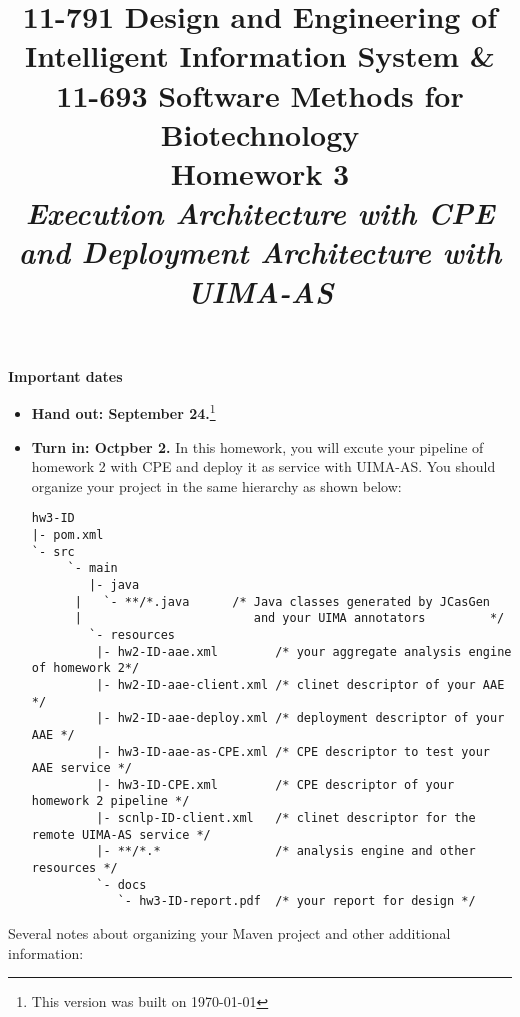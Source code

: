 \documentclass[oneside]{memoir}
\title{{\bfseries 11-791 Design and Engineering of Intelligent Information
System \& \\11-693 Software Methods for Biotechnology \\Homework 3}\\
\vspace{1em}
\itshape\rmfamily 
Execution Architecture with CPE and Deployment Architecture with UIMA-AS}
\date{}
\begin{document}
\begin{titlingpage}
\maketitle

\hspace{-0.1\textwidth}
\begin{minipage}{1.2\textwidth}
\vspace{-5em}
\textbf{Important dates}
\begin{itemize}

\item \textbf{Hand out: September 24.}\footnote{This version was built on \today}

\item \textbf{Turn in: Octpber 2.} In this homework, you will excute your pipeline of homework 2
with CPE and deploy it as service with UIMA-AS. 
You should organize your project in the same
hierarchy as shown below:

\small
\begin{verbatim}
hw3-ID
|- pom.xml
`- src
     `- main
        |- java
      |   `- **/*.java      /* Java classes generated by JCasGen
      |                        and your UIMA annotators         */ 
        `- resources
         |- hw2-ID-aae.xml        /* your aggregate analysis engine of homework 2*/
         |- hw2-ID-aae-client.xml /* clinet descriptor of your AAE */
         |- hw2-ID-aae-deploy.xml /* deployment descriptor of your AAE */
         |- hw3-ID-aae-as-CPE.xml /* CPE descriptor to test your AAE service */
         |- hw3-ID-CPE.xml        /* CPE descriptor of your homework 2 pipeline */
         |- scnlp-ID-client.xml   /* clinet descriptor for the remote UIMA-AS service */
         |- **/*.*                /* analysis engine and other resources */
         `- docs
            `- hw3-ID-report.pdf  /* your report for design */

\end{verbatim}
\normalsize

\end{itemize}

\end{minipage}
\hspace{-0.1\textwidth}

\hspace{-0.1\textwidth}
\begin{minipage}{1.2\textwidth}

Several notes about organizing your Maven project and other additional
information:


\end{minipage}
\end{titlingpage}
\end{document}

